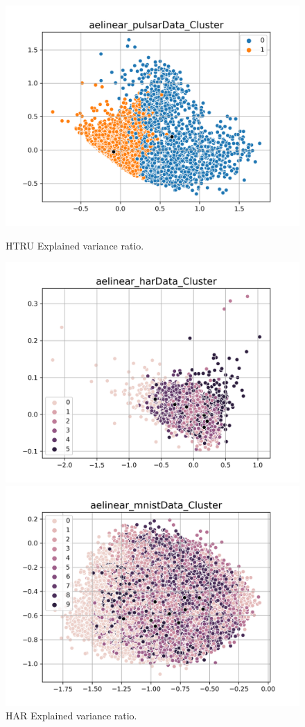 \documentclass[journal]{IEEEtran}
\begin{document}
\begin{figure}[!htb]
    \includegraphics[width=\linewidth]{images/aelinear_pulsarData_Cluster.png}
    \caption{HTRU Explained variance ratio.}\label{fig_aelinear_pulsarData_Cluster}
  \endminipage\hfill
    \includegraphics[width=\linewidth]{images/aelinear_harData_Cluster.png}
    \caption{HAR Explained variance ratio.}\label{fig_aelinear_harData_Cluster}
  \endminipage\hfill
    \includegraphics[width=\linewidth]{images/aelinear_mnistData_Cluster.png}

\end{figure}
\end{document}
